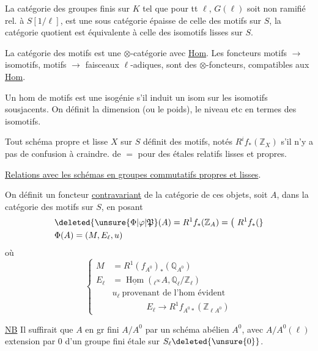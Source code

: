 La catégorie des groupes finis  sur $K$ tel que pour tt $\ell$, $G(\ell)$ soit non ramifié rel. à $S[1/\ell]$, est une sous catégorie épaisse de celle des motifs sur $S$, la catégorie quotient est équivalente à celle des isomotifs lisses sur $S$.

La catégorie des motifs est une $\otimes$-catégorie avec \uline{Hom}. Les foncteurs motifs $\longrightarrow$ isomotifs, motifs $\to$ faisceaux $\ell$-adiques, sont des $\otimes$-foncteurs, compatibles aux \uline{Hom}.

Un  hom de motifs est une isogénie s'il induit un isom sur les isomotifs sousjacents. On définit la dimension (ou le poids), le niveau etc en termes des isomotifs.

Tout schéma propre et lisse $X$ sur $S$ définit des motifs, notés $R^i f_*(\mathbb Z_X)$ s'il n'y a pas de confusion à craindre. de $=$ pour des  étales relatifs lisses et propres.

\uline{Relations avec les schémas en groupes commutatifs propres et lisses}.

On définit un foncteur \uline{contravariant} de la catégorie de ces objets, soit $A$, dans la catégorie des motifs sur $S$, en posant
\[
\begin{aligned}
&\deleted{\unsure{\Phi|\varphi|\mathfrak P}(A)=R^1 f_*(\mathbb Z_A)=\bigl(\ R^1 f_*(\bigr.}\\
&\Phi(A)=(M,E_\ell,u)
\end{aligned}
\]
où
\[
\left\{\begin{aligned}
 M&=R^1(f_{A^0})_*(\mathbb Q_{A^0})\\
 E_\ell&=\underline{\operatorname{Hom}}({}_{\ell^\infty}A,\mathbb Q_\ell/\mathbb Z_\ell)\\
 &u_\ell\ \text{provenant de l'hom évident}\\
 &\hspace{4em}E_\ell\longrightarrow R^1 f_{A^0*}(\mathbb Z_{\ell A^0})
\end{aligned}\right.
\]

\uline{NB} Il suffirait que $A$   en gr fini $A/A^0$ par un schéma abélien $A^0$, avec $A/A^0(\ell)$ extension par $0$ d'un groupe fini étale sur $S_\ell\deleted{\unsure{0}}$.

